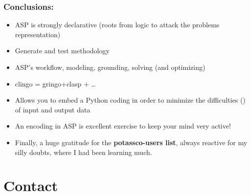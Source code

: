 \documentclass{beamer}
\begin{document}

\begin{frame}[fragile] 
	\frametitle{Conclusions:}
	
\begin{block}{}
\begin{itemize}
  

  \item ASP is strongly declarative (roots from logic to attack the problems representation)
  
  \item Generate and test methodology
    
  \item ASP's workflow, modeling, grounding, solving
    (and optimizing)
  \item clingo = gringo$+$clasp $+$ \dots

  \item Allows you to embed a Python coding in order to minimize the difficulties (\Frowny) of input and output data
		
   \item An encoding in ASP is excellent exercise to keep your mind very active!

	\item Finally, a huge gratitude for the \textbf{potassco-users list}, always reactive for my silly doubts,  where I had been learning much.
		
	\end{itemize}
\end{block}
\end{frame}



\section*{Contact}
\end{document}
